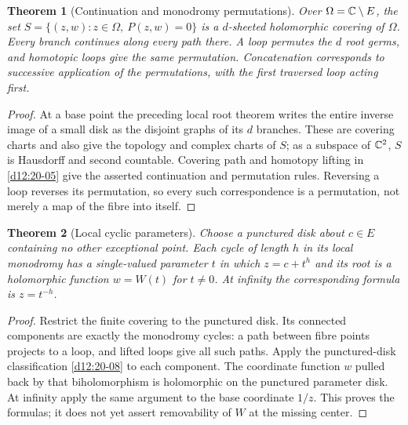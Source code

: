 \documentclass[11pt,a4paper,openany]{book}
\newtheorem{theorem}{Theorem}[chapter]
\theoremstyle{definition}
\theoremstyle{remark}\newtheorem{remark}[theorem]{Remark}
\newcommand{\family}[1]{}
\begin{document}
\begin{theorem}[Continuation and monodromy permutations]\label{d12:21-03}\family{D12.21.03}
Over $\Omega=\mathbb C\setminus E$, the set
$S=\{(z,w):z\in\Omega,\ P(z,w)=0\}$ is a $d$-sheeted holomorphic
covering of $\Omega$. Every branch continues along every path there.
A loop permutes the $d$ root germs, and homotopic loops give the same
permutation. Concatenation corresponds to successive application of the
permutations, with the first traversed loop acting first.
\end{theorem}
\begin{proof}
At a base point the preceding local root theorem writes the entire inverse
image of a small disk as the disjoint graphs of its $d$ branches. These
are covering charts and also give the topology and complex charts of
$S$; as a subspace of $\mathbb C^2$, $S$ is Hausdorff and second countable.
Covering path and homotopy lifting in \cref{d12:20-05} give the asserted
continuation and permutation rules. Reversing a loop reverses its
permutation, so every such correspondence is a permutation, not merely
a map of the fibre into itself.
\end{proof}

\begin{theorem}[Local cyclic parameters]\label{d12:21-04}\family{D12.21.04}
Choose a punctured disk about $c\in E$ containing no other exceptional
point. Each cycle of length $h$ in its local monodromy has a single-valued
parameter $t$ in which $z=c+t^h$ and its root is a holomorphic function
$w=W(t)$ for $t\ne0$. At infinity the corresponding formula is
$z=t^{-h}$.
\end{theorem}
\begin{proof}
Restrict the finite covering to the punctured disk. Its connected
components are exactly the monodromy cycles: a path between fibre points
projects to a loop, and lifted loops give all such paths. Apply the
punctured-disk classification \cref{d12:20-08} to each component.
The coordinate function $w$ pulled back by that biholomorphism is
holomorphic on the punctured parameter disk. At infinity apply the same
argument to the base coordinate $1/z$. This proves the formulas; it does
not yet assert removability of $W$ at the missing center.
\end{proof}
\end{document}

